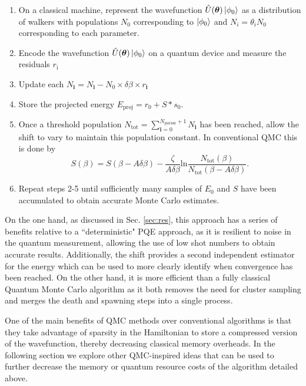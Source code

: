 \documentclass[%
 reprint,
 amsmath,amssymb,
 aps,
]{revtex4-2}
\begin{document}
\begin{enumerate}
    \item On a classical machine, represent the wavefunction $\hat U (\boldsymbol{\theta})\ket{\phi_0}$ as a distribution of walkers with populations $N_0$ corresponding to $\ket{\phi_0}$ and $N_i = \theta_i N_0$ corresponding to each parameter.
    \item Encode the wavefunction $\hat U (\boldsymbol{\theta})\ket{\phi_0}$ on a quantum device and measure the residuals $r_\mathrm{i}$
    \item Update each $N_\mathbf{i} = N_\mathbf{i} - N_0 \times \delta\beta \times r_\mathbf{i}$
    \item Store the projected energy $E_\mathrm{proj} = r_0 + S * s_0$.
    \item Once a threshold population $N_\mathrm{tot} = \sum_{\mathbf{i}=0}^{N_\mathrm{param} +1} N_\mathbf{i}$ has been reached, allow the shift to vary to maintain this population constant. In conventional QMC this is done by\cite{Booth2009}
    \begin{equation}
        S(\beta) = S(\beta - A\delta\beta) - \frac{\zeta}{A\delta\beta}\mathrm{ln}\frac{N_\mathrm{tot}(\beta)}{N_\mathrm{tot}(\beta - A\delta\beta)}.
        \label{eq:shift}
    \end{equation}
    \item Repeat steps 2-5 until sufficiently many samples of $E_0$ and $S$ have been accumulated to obtain accurate Monte Carlo estimates.
\end{enumerate}
On the one hand, as discussed in Sec. \ref{sec:res}, this approach has a series of benefits relative to a ``deterministic" PQE approach, as it is resilient to noise in the quantum measurement, allowing the use of low shot numbers to obtain accurate results. Additionally, the shift provides a second independent estimator for the energy which can be used to more clearly identify when convergence has been reached. On the other hand, it is more efficient than a fully classical Quantum Monte Carlo algorithm as it both removes the need for cluster sampling and merges the death and spawning steps into a single process.

One of the main benefits of QMC methods over conventional algorithms is that they take advantage of sparsity in the Hamiltonian to store a compressed version of the wavefunction, thereby decreasing classical memory overheads. In the following section we explore other QMC-inspired ideas that can be used to further decrease the memory or quantum resource costs of the algorithm detailed above.
\end{document}
